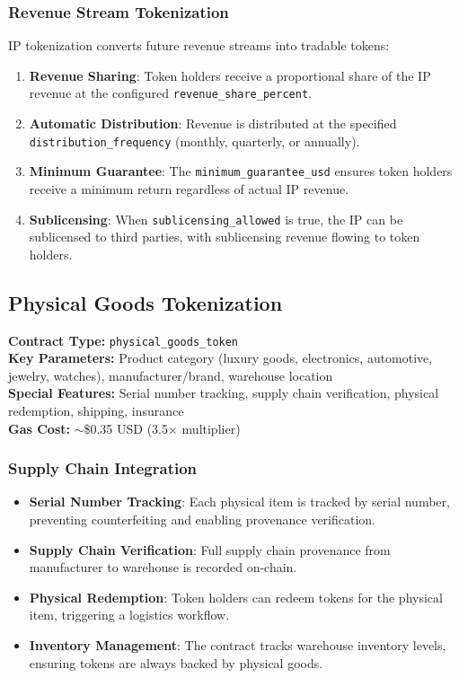 \documentclass[11pt,a4paper,twoside]{article}
\begin{document}
\subsubsection{Revenue Stream Tokenization}

IP tokenization converts future revenue streams into tradable tokens:

\begin{enumerate}
  \item \textbf{Revenue Sharing}: Token holders receive a proportional share of the IP revenue at the configured \texttt{revenue\_share\_percent}.
  \item \textbf{Automatic Distribution}: Revenue is distributed at the specified \texttt{distribution\_frequency} (monthly, quarterly, or annually).
  \item \textbf{Minimum Guarantee}: The \texttt{minimum\_guarantee\_usd} ensures token holders receive a minimum return regardless of actual IP revenue.
  \item \textbf{Sublicensing}: When \texttt{sublicensing\_allowed} is true, the IP can be sublicensed to third parties, with sublicensing revenue flowing to token holders.
\end{enumerate}

\subsection{Physical Goods Tokenization}
\label{subsec:physical-goods}

\begin{keyinsight}
\textbf{Contract Type:} \texttt{physical\_goods\_token}\\
\textbf{Key Parameters:} Product category (luxury goods, electronics, automotive, jewelry, watches), manufacturer/brand, warehouse location\\
\textbf{Special Features:} Serial number tracking, supply chain verification, physical redemption, shipping, insurance\\
\textbf{Gas Cost:} $\sim$\$0.35 USD (3.5$\times$ multiplier)
\end{keyinsight}

\subsubsection{Supply Chain Integration}

\begin{itemize}
  \item \textbf{Serial Number Tracking}: Each physical item is tracked by serial number, preventing counterfeiting and enabling provenance verification.
  \item \textbf{Supply Chain Verification}: Full supply chain provenance from manufacturer to warehouse is recorded on-chain.
  \item \textbf{Physical Redemption}: Token holders can redeem tokens for the physical item, triggering a logistics workflow.
  \item \textbf{Inventory Management}: The contract tracks warehouse inventory levels, ensuring tokens are always backed by physical goods.
\end{itemize}
\end{document}
